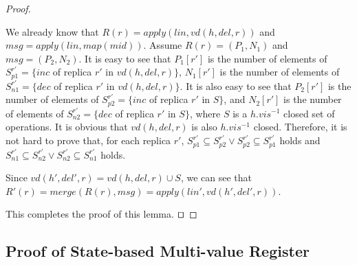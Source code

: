 \begin {proof}
\begin{itemize}
    We already know that $R(r) = \mathit{apply}(\mathit{lin},\mathit{vd}(h,\mathit{del},r))$ and $\mathit{msg} = \mathit{apply}(\mathit{lin},\mathit{map}(\mathit{mid}))$. Assume $R(r) = (P_1,N_1)$ and $\mathit{msg} = (P_2,N_2)$. It is easy to see that $P_1[r']$ is the number of elements of $S_{\mathit{p1}}^{r'} = \{ \mathit{inc}$ of replica $r'$ in $\mathit{vd}(h,\mathit{del},r) \}$, $N_1[r']$ is the number of elements of $S_{\mathit{n1}}^{r'} = \{ \mathit{dec}$ of replica $r'$ in $\mathit{vd}(h,\mathit{del},r) \}$. It is also easy to see that $P_2[r']$ is the number of elements of $S_{\mathit{p2}}^{r'} = \{ \mathit{inc}$ of replica $r'$ in $S \}$, and $N_2[r']$ is the number of elements of $S_{\mathit{n2}}^{r'} = \{ \mathit{dec}$ of replica $r'$ in $S \}$, where $S$ is a $h.\mathit{vis}^{-1}$ closed set of operations. It is obvious that $\mathit{vd}(h,\mathit{del},r)$ is also $h.\mathit{vis}^{-1}$ closed. Therefore, it is not hard to prove that, for each replica $r'$, $S_{\mathit{p1}}^{r'} \subseteq S_{\mathit{p2}}^{r'} \vee S_{\mathit{p2}}^{r'} \subseteq S_{\mathit{p1}}^{r'}$ holds and $S_{\mathit{n1}}^{r'} \subseteq S_{\mathit{n2}}^{r'} \vee S_{\mathit{n2}}^{r'} \subseteq S_{\mathit{n1}}^{r'}$ holds. 
    
    Since $\mathit{vd}(h',\mathit{del}',r) = \mathit{vd}(h,\mathit{del},r) \cup S$, we can see that $R'(r) = \mathit{merge}(R(r),\mathit{msg}) = \mathit{apply}(\mathit{lin}',\mathit{vd}(h',\mathit{del}',r))$. 

  
\end{itemize}

This completes the proof of this lemma. $\qed$ 
\end {proof}




\subsection{Proof of State-based Multi-value Register}
\label{subsec:appendix proof of state-based multi-value register}

